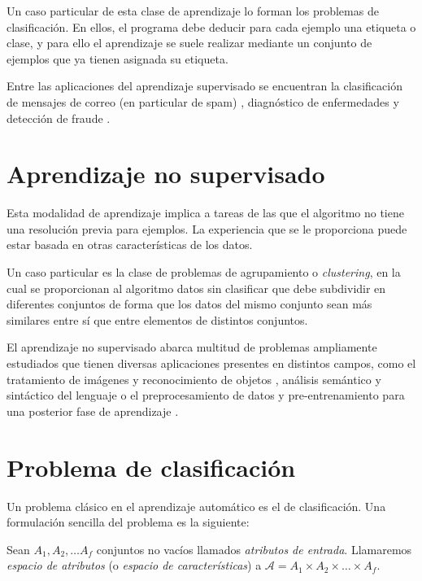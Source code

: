 Un caso particular de esta clase de aprendizaje lo forman los problemas
de clasificación. En ellos, el programa debe deducir para cada ejemplo
una etiqueta o clase, y para ello el aprendizaje se suele realizar
mediante un conjunto de ejemplos que ya tienen asignada su etiqueta.

Entre las aplicaciones del aprendizaje supervisado se encuentran la
clasificación de mensajes de correo (en particular de spam)
\autocite{cohen1996}, diagnóstico de enfermedades
\autocite{kononenko2001} y detección de fraude \autocite{phua2010}.

\section{Aprendizaje no supervisado}\label{aprendizaje-no-supervisado}

Esta modalidad de aprendizaje implica a tareas de las que el algoritmo
no tiene una resolución previa para ejemplos. La experiencia que se le
proporciona puede estar basada en otras características de los datos.

Un caso particular es la clase de problemas de agrupamiento o
\emph{clustering}, en la cual se proporcionan al algoritmo datos sin
clasificar que debe subdividir en diferentes conjuntos de forma que los
datos del mismo conjunto sean más similares entre sí que entre elementos
de distintos conjuntos.

El aprendizaje no supervisado abarca multitud de problemas ampliamente
estudiados que tienen diversas aplicaciones presentes en distintos
campos, como el tratamiento de imágenes y reconocimiento de objetos
\autocite{ranzato}, análisis semántico \autocite{hofmann} y sintáctico
del lenguaje \autocite{brent} o el preprocesamiento de datos y
pre-entrenamiento para una posterior fase de aprendizaje
\autocite{erhan2009}.

\section{Problema de clasificación}\label{problema-de-clasificaciuxf3n}

Un problema clásico en el aprendizaje automático es el de clasificación.
Una formulación sencilla del problema es la siguiente:

Sean \(A_1, A_2, \dots A_f\) conjuntos no vacíos llamados
\emph{atributos de entrada}. Llamaremos \emph{espacio de atributos} (o
\emph{espacio de características}) a
\(\mathcal A=A_1\times A_2\times\dots\times A_f\). 

